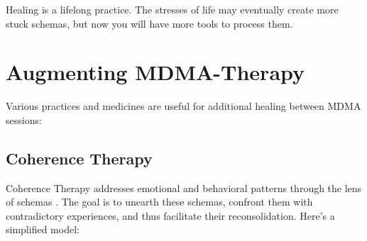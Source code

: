 \documentclass[12pt,letterpaper]{article}
\begin{document}
Healing is a lifelong practice. The stresses of life may eventually create more stuck schemas, but now you will have more tools to process them.
\section{Augmenting MDMA-Therapy}
\label{healingPractices}
Various practices and medicines are useful for additional healing between MDMA sessions:
\subsection{Coherence Therapy}
Coherence Therapy addresses emotional and behavioral patterns through the lens of schemas \cite{eckerUnlocking}. The goal is to unearth these schemas, confront them with contradictory experiences, and thus facilitate their reconsolidation. Here's a simplified model:
\end{document}
